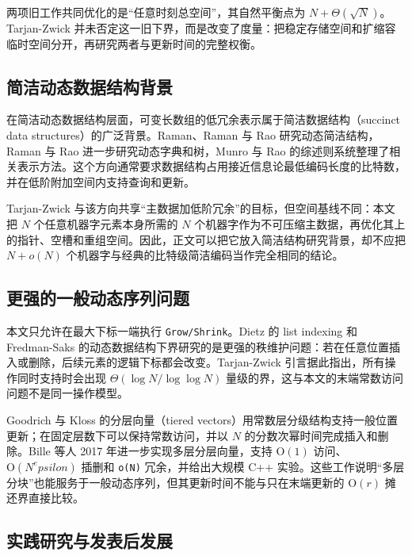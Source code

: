 \documentclass[UTF8,11pt,a4paper]{ctexart}
\begin{document}
两项旧工作共同优化的是“任意时刻总空间”，其自然平衡点为 $N+\Theta(\sqrt{N})$。Tarjan-Zwick 并未否定这一旧下界，而是改变了度量：把稳定存储空间和扩缩容临时空间分开，再研究两者与更新时间的完整权衡。\par

\subsection{简洁动态数据结构背景}

在简洁动态数据结构层面，可变长数组的低冗余表示属于简洁数据结构（succinct data structures）的广泛背景。Raman、Raman 与 Rao 研究动态简洁结构，Raman 与 Rao 进一步研究动态字典和树，Munro 与 Rao 的综述则系统整理了相关表示方法。这个方向通常要求数据结构占用接近信息论最低编码长度的比特数，并在低阶附加空间内支持查询和更新。\par

Tarjan-Zwick 与该方向共享“主数据加低阶冗余”的目标，但空间基线不同：本文把 $N$ 个任意机器字元素本身所需的 $N$ 个机器字作为不可压缩主数据，再优化其上的指针、空槽和重组空间。因此，正文可以把它放入简洁结构研究背景，却不应把 $N+o(N)$ 个机器字与经典的比特级简洁编码当作完全相同的结论。\par

\subsection{更强的一般动态序列问题}

本文只允许在最大下标一端执行 \textnormal{\texttt{Grow/Shrink}}。Dietz 的 list indexing 和 Fredman-Saks 的动态数据结构下界研究的是更强的秩维护问题：若在任意位置插入或删除，后续元素的逻辑下标都会改变。Tarjan-Zwick 引言据此指出，所有操作同时支持时会出现 $\Theta(\log N/\log \log N)$ 量级的界，这与本文的末端常数访问问题不是同一操作模型。\par

Goodrich 与 Kloss 的分层向量（tiered vectors）用常数层分级结构支持一般位置更新；在固定层数下可以保持常数访问，并以 $N$ 的分数次幂时间完成插入和删除。Bille 等人 2017 年进一步实现多层分层向量，支持 $\mathrm{O}(1)$ 访问、$\mathrm{O}(N^epsilon)$ 插删和 \textnormal{\texttt{o(N)}} 冗余，并给出大规模 C++ 实验。这些工作说明“多层分块”也能服务于一般动态序列，但其更新时间不能与只在末端更新的 $\mathrm{O}(r)$ 摊还界直接比较。\par

\subsection{实践研究与发表后发展}
\end{document}
